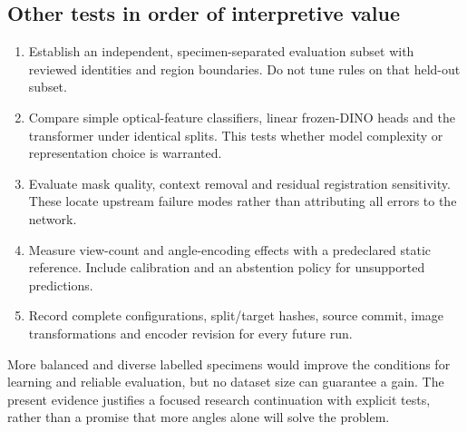 \subsection{Other tests in order of interpretive value}
\begin{enumerate}
\item Establish an independent, specimen-separated evaluation subset with reviewed identities and region boundaries. Do not tune rules on that held-out subset.
\item Compare simple optical-feature classifiers, linear frozen-DINO heads and the transformer under identical splits. This tests whether model complexity or representation choice is warranted.
\item Evaluate mask quality, context removal and residual registration sensitivity. These locate upstream failure modes rather than attributing all errors to the network.
\item Measure view-count and angle-encoding effects with a predeclared static reference. Include calibration and an abstention policy for unsupported predictions.
\item Record complete configurations, split/target hashes, source commit, image transformations and encoder revision for every future run.
\end{enumerate}
More balanced and diverse labelled specimens would improve the conditions for learning and reliable evaluation, but no dataset size can guarantee a gain. The present evidence justifies a focused research continuation with explicit tests, rather than a promise that more angles alone will solve the problem.
\FloatBarrier
